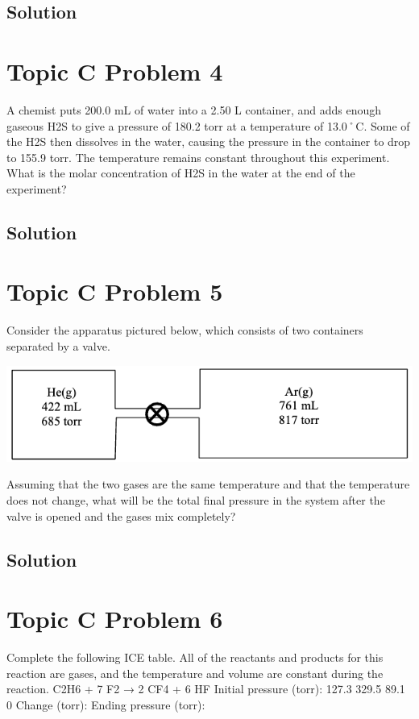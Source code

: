 \documentclass[10pt]{article}
\begin{document}
        \subsection{Solution}

    \pagebreak
    \section{Topic C Problem 4}
        A chemist puts 200.0 mL of water into a 2.50 L container, and adds enough gaseous H2S to give a pressure of 180.2 torr at a temperature of 13.0˚C. 
        Some of the H2S then dissolves in the water, causing the pressure in the container to drop to 155.9 torr. 
        The temperature remains constant throughout this experiment. 
        What is the molar concentration of H2S in the water at the end of the experiment?

        \subsection{Solution}

    \pagebreak
    \section{Topic C Problem 5}
        Consider the apparatus pictured below, which consists of two containers separated by a valve.
        \begin{center}
            \includegraphics{picture_C-5.png}
        \end{center}
        Assuming that the two gases are the same temperature and that the temperature does not change, what will be the total final pressure in the system after the valve is opened and the gases mix completely?

        \subsection{Solution}

    \pagebreak
    \section{Topic C Problem 6}
        Complete the following ICE table. 
        All of the reactants and products for this reaction are gases, and the temperature and volume are constant during the reaction.
        C2H6 + 7 F2 → 2 CF4 + 6 HF
        Initial pressure (torr): 127.3 329.5 89.1 0
        Change (torr):
        Ending pressure (torr):
\end{document}
